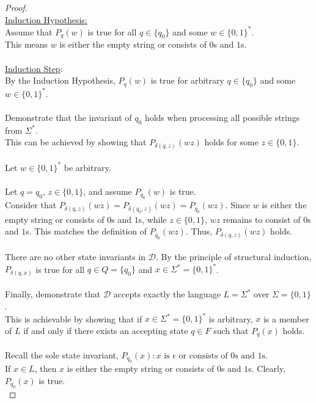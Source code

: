 \documentclass[12pt]{article}
\begin{document}
\begin{proof}
    \\
    \underline{Induction Hypothesis:} \\
    Assume that $P_q(w)$ is true for all $q \in \{q_0\}$ and some $w \in \{0, 1\}^*$. \\
    This means $w$ is either the empty string or consists of $0$s and $1$s. \\
    \\
    \underline{Induction Step}: \\
    By the Induction Hypothesis, $P_q(w)$ is true for arbitrary $q \in \{q_0\}$ and some $w \in \{0, 1\}^*$. \\
    \\
    Demonstrate that the invariant of $q_0$ holds when processing all possible strings from $\Sigma^*$. \\
    This can be achieved by showing that $P_{\delta(q, z)}(wz)$ holds for some $z \in \{0, 1\}$. \\
    \\
    Let $w \in \{0, 1\}^*$ be arbitrary. \\
    \\
    Let $q = q_0$, $z \in \{0, 1\}$, and assume $P_{q_0}(w)$ is true. \\
    Consider that $P_{\delta(q, z)}(wz) = P_{\delta(q_0, z)}(wz) = P_{q_0}(wz)$. Since $w$ is either the empty string or consists of $0$s and $1$s, while $z \in \{0, 1\}$, $wz$ remains to consist of $0$s and $1$s. This matches the definition of $P_{q_0}(wz)$. Thus, $P_{\delta(q, z)}(wz)$ holds. \\
    \\
    There are no other state invariants in $\mathcal{D}$. By the principle of structural induction, $P_{\delta(q, x)}$ is true for all $q \in Q = \{q_0\}$ and $x \in \Sigma^* = \{0, 1\}^*$. \\
    \\
    Finally, demonstrate that $\mathcal{D}$ accepts exactly the language $L = \Sigma^*$ over $\Sigma = \{0, 1\}$. \\
    This is achievable by showing that if $x \in \Sigma^* = \{0, 1\}^*$ is arbitrary, $x$ is a member of $L$ if and only if there exists an accepting state $q \in F$ such that $P_q(x)$ holds. \\
    \\
    Recall the sole state invariant, $P_{q_0}(x): \text{$x$ is $\epsilon$ or consists of $0$s and $1$s}$. \\
    If $x \in L$, then $x$ is either the empty string or consists of $0$s and $1$s. Clearly, $P_{q_0}(x)$ is true. \\

\end{proof}
\end{document}
